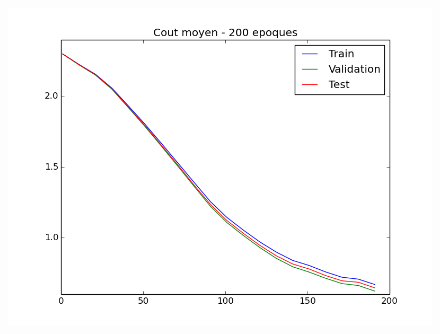 \documentclass[a4paper,11pt]{article}
\begin{document}
\begin{figure}[H]
	\includegraphics[width=15cm]{images/best_cout_moyen.png}
	\centering
	\label{fig:comp}
\end{figure}
\end{document}
